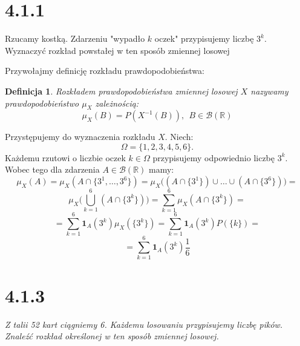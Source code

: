 \documentclass{article}
\newtheorem*{definition}{Definicja}
\begin{document}
\section*{4.1.1}
\begin{center}
    Rzucamy kostką. Zdarzeniu "wypadło \(k\) oczek" przypisujemy liczbę \(3^k\). Wyznaczyć rozkład powstałej w ten sposób
    zmiennej losowej
\end{center}

Przywołajmy definicję rozkładu prawdopodobieństwa:
\begin{definition}
Rozkładem prawdopodobieństwa zmiennej losowej \(X\) nazywamy prawdopodobieństwo \(\mu_{X}\) zależnością:
\begin{equation*}
        \mu_{X}(B) = P(X^{-1}(B)), \ \ B \in \mathcal{B}(\mathbb{R})
\end{equation*}
\end{definition}
\noindent
Przystępujemy do wyznaczenia rozkładu \(X\). Niech: 
\begin{equation*}
    \Omega = \{1, 2, 3, 4, 5, 6\}.
\end{equation*}
Każdemu rzutowi o liczbie oczek \(k \in \Omega\) przypisujemy odpowiednio liczbę \(3^k\). Wobec tego dla
zdarzenia \(A \in \mathcal{B}(\mathbb{R})\) mamy:
\begin{equation*}
    \mu_{X}(A) = \mu_{X}(A \cap \{3^1, \dots, 3^6\}) = \mu_{X}\Big((A \cap \{3^1\}) \cup \dots \cup (A \cap \{3^6\})\Big) =
\end{equation*}
\begin{equation*}
    \mu_{X}\Biggr(\bigcup_{k=1}^{6}(A \cap \{3^k\})\Biggr) = \sum_{k=1}^{6} \mu_{X}(A \cap \{3^k\}) = 
\end{equation*}
\begin{equation*}
    = \sum_{k=1}^{6} \mathbf{1}_{A}(3^k) \mu_{X}(\{3^k\}) = \sum_{k=1}^{6} \mathbf{1}_{A}(3^k) P(\{k\}) = 
\end{equation*}
\begin{equation*}
    = \sum_{k=1}^{6} \mathbf{1}_{A}(3^k) \frac{1}{6}
\end{equation*}

\section*{4.1.3}

\begin{center}
    \emph{Z talii 52 kart ciągniemy 6. Każdemu losowaniu przypisujemy liczbę pików. Znaleźć rozkład określonej w ten sposób
zmiennej losowej.}
\end{center}
\end{document}
